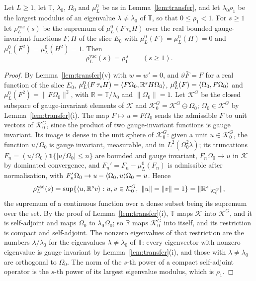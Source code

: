 \begin{proposition}\label{prop:vacuumlayers}
Let $L\ge1$, let $\mathbb T$, $\lambda_0$, $\Omega_0$ and $\mu^0_L$ be as in
Lemma~\textup{\ref{lem:transfer}}, and let $\lambda_0\rho_1$ be the largest
modulus of an eigenvalue $\lambda\ne\lambda_0$ of $\mathbb T$, so that
$0\le\rho_1<1$. For $s\ge1$ let $\rho^{\mathrm{vac}}_L(s)$ be the supremum
of $\mu^0_L(F\,\tau_sH)$ over the real bounded gauge-invariant functions
$F,H$ of the slice $E_0$ with $\mu^0_L(F)=\mu^0_L(H)=0$ and $\mu^0_L(F^2)=
\mu^0_L(H^2)=1$. Then
\[
\rho^{\mathrm{vac}}_L(s)=\rho_1^{\,s}\qquad(s\ge1).
\]
\end{proposition}

\begin{proof}
By Lemma~\ref{lem:transfer}(v) with $w=w'=0$, and $\vartheta\bar F=F$ for a
real function of the slice $E_0$, $\mu^0_L(F\,\tau_sH)=\langle F\Omega_0,\mathbb R^sH\Omega_0\rangle$, $\mu^0_L(F)=\langle \Omega_0,F\Omega_0\rangle$ and
$\mu^0_L(F^2)=\|F\Omega_0\|^2$, with $\mathbb R=\mathbb T/\lambda_0$ and
$\|\Omega_0\|=1$. Let $\mathcal K^G$ be the closed subspace of gauge-invariant
elements of $\mathcal K$ and $\mathcal K^G_0=\mathcal K^G\ominus\Omega_0$;
$\Omega_0\in\mathcal K^G$ by Lemma~\ref{lem:transfer}(i). The map $F\mapsto
u=F\Omega_0$ sends the admissible $F$ to unit vectors of $\mathcal K^G_0$,
since the product of two gauge-invariant functions is gauge invariant. Its
image is dense in the unit sphere of $\mathcal K^G_0$: given a unit
$u\in\mathcal K^G_0$, the function $u/\Omega_0$ is gauge invariant,
measurable, and in $L^2(\Omega_0^2\lambda)$; its truncations $F_n=
(u/\Omega_0)\mathbf 1\{|u/\Omega_0|\le n\}$ are bounded and gauge invariant,
$F_n\Omega_0\to u$ in $\mathcal K$ by dominated convergence, and $F_n'=F_n-
\mu^0_L(F_n)$ is admissible after normalisation, with $F_n'\Omega_0\to u-
\langle \Omega_0,u\rangle\Omega_0=u$. Hence
\[
\rho^{\mathrm{vac}}_L(s)=\sup\{\langle u,\mathbb R^sv\rangle:u,v\in\mathcal K^G_0,\
\|u\|=\|v\|=1\}=\|\mathbb R^s|_{\mathcal K^G_0}\|,
\]
the supremum of a continuous function over a dense subset being its
supremum over the set. By the proof of Lemma~\ref{lem:transfer}(i),
$\mathbb T$ maps $\mathcal K$ into $\mathcal K^G$, and it is self-adjoint and
maps $\Omega_0$ to $\lambda_0\Omega_0$; so $\mathbb R$ maps $\mathcal K^G_0$
into itself, and its restriction is compact and self-adjoint. The nonzero
eigenvalues of that restriction are the numbers $\lambda/\lambda_0$ for the
eigenvalues $\lambda\ne\lambda_0$ of $\mathbb T$: every eigenvector with
nonzero eigenvalue is gauge invariant by Lemma~\ref{lem:transfer}(i), and
those with $\lambda\ne\lambda_0$ are orthogonal to $\Omega_0$. The norm of
the $s$-th power of a compact self-adjoint operator is the $s$-th power of
its largest eigenvalue modulus, which is $\rho_1$.
\end{proof}

